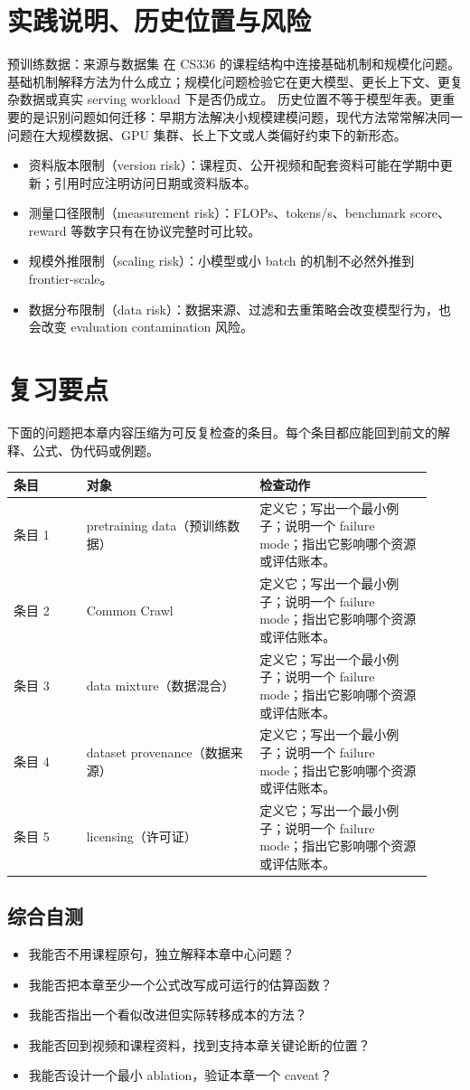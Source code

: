 \documentclass[a4paper]{article}
\begin{document}
\section{实践说明、历史位置与风险}
预训练数据：来源与数据集 在 CS336 的课程结构中连接基础机制和规模化问题。基础机制解释方法为什么成立；规模化问题检验它在更大模型、更长上下文、更复杂数据或真实 serving workload 下是否仍成立。
历史位置不等于模型年表。更重要的是识别问题如何迁移：早期方法解决小规模建模问题，现代方法常常解决同一问题在大规模数据、GPU 集群、长上下文或人类偏好约束下的新形态。
\begin{itemize}
\item 资料版本限制（version risk）：课程页、公开视频和配套资料可能在学期中更新；引用时应注明访问日期或资料版本。
\item 测量口径限制（measurement risk）：FLOPs、tokens/s、benchmark score、reward 等数字只有在协议完整时可比较。
\item 规模外推限制（scaling risk）：小模型或小 batch 的机制不必然外推到 frontier-scale。
\item 数据分布限制（data risk）：数据来源、过滤和去重策略会改变模型行为，也会改变 evaluation contamination 风险。
\end{itemize}
\section{复习要点}
下面的问题把本章内容压缩为可反复检查的条目。每个条目都应能回到前文的解释、公式、伪代码或例题。
\begin{longtable}{p{0.16\linewidth}p{0.38\linewidth}p{0.38\linewidth}}
\toprule
\textbf{条目} & \textbf{对象} & \textbf{检查动作}\\
\midrule
条目 1 & pretraining data（预训练数据） & 定义它；写出一个最小例子；说明一个 failure mode；指出它影响哪个资源或评估账本。\\
条目 2 & Common Crawl & 定义它；写出一个最小例子；说明一个 failure mode；指出它影响哪个资源或评估账本。\\
条目 3 & data mixture（数据混合） & 定义它；写出一个最小例子；说明一个 failure mode；指出它影响哪个资源或评估账本。\\
条目 4 & dataset provenance（数据来源） & 定义它；写出一个最小例子；说明一个 failure mode；指出它影响哪个资源或评估账本。\\
条目 5 & licensing（许可证） & 定义它；写出一个最小例子；说明一个 failure mode；指出它影响哪个资源或评估账本。\\
\bottomrule
\end{longtable}
\subsection{综合自测}
\begin{itemize}
\item 我能否不用课程原句，独立解释本章中心问题？
\item 我能否把本章至少一个公式改写成可运行的估算函数？
\item 我能否指出一个看似改进但实际转移成本的方法？
\item 我能否回到视频和课程资料，找到支持本章关键论断的位置？
\item 我能否设计一个最小 ablation，验证本章一个 caveat？
\end{itemize}
\end{document}
